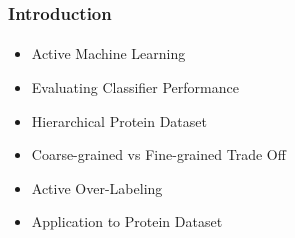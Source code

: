 \documentclass{beamer}
\begin{document}
\begin{frame}
    \frametitle{Introduction}
    \framesubtitle{}
\begin{itemize}
  \item Active Machine Learning
  \item Evaluating Classifier Performance
  \item Hierarchical Protein Dataset
  \item Coarse-grained vs Fine-grained Trade Off
  \item Active Over-Labeling
  \item Application to Protein Dataset
\end{itemize}
\end{frame}
\end{document}

